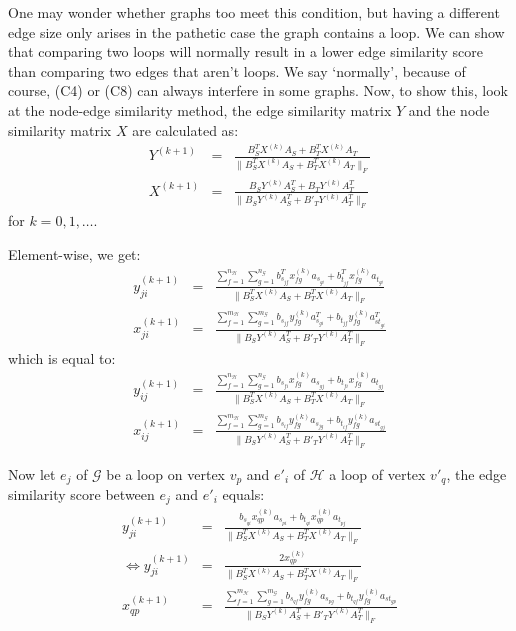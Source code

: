 \documentclass[a4paper,11pt]{report}
\newcommand{\graf}{\mathscr{G}}
\newcommand{\grafeen}{\mathscr{H}}
\begin{document}
\begin{itemize}
One may wonder whether graphs too meet this condition, but having a different edge size only 
arises in the pathetic case the graph contains a loop. We can show that comparing two loops will normally result
in a lower edge similarity score than comparing two edges that aren't loops. We say `normally', because of course, (C4) or (C8) can always
interfere in some graphs. Now, to show this, look at the 
node-edge similarity method, the edge similarity matrix $Y$ and the node 
similarity matrix $X$ are calculated as:
\begin{eqnarray}
  Y^{(k+1)} &=& \frac{B_S^TX^{(k)}A_S + B_T^TX^{(k)}A_T}{\|B_S^TX^{(k)}A_S + 
  B_T^TX^{(k)}A_T\|_F}\\
   X^{(k+1)} &=& \frac{B_SY^{(k)}A_S^T + B_TY^{(k)}A^T_T}{\|B_SY^{(k)}A_S^T + 
   B'_TY^{(k)}A^T_T\|_F} \end{eqnarray}
  for  $k =  0,1,\ldots$.
  
 Element-wise, we get:
  \begin{eqnarray*}
  y^{(k+1)}_{ji} &=& \frac{\sum^{n_\grafeen}_{f=1}\sum^{n_\graf}_{g=1} b_{s_{jf}}^Tx_{fg}^{(k)}a_{s_{gi}} + b_{t_{jf}}^Tx_{fg}^{(k)}a_{t_{gi}}}{\|B_S^TX^{(k)}A_S + 
  B_T^TX^{(k)}A_T\|_F}\\
   x^{(k+1)}_{ji} &=& \frac{\sum^{m_\grafeen}_{f=1}\sum^{m_\graf}_{g=1} b_{s_{jf}}y_{fg}^{(k)}a_{s_{gi}}^T + b_{t_{jf}}y_{fg}^{(k)}a_{st_{gi}}^T}{\|B_SY^{(k)}A_S^T + 
   B'_TY^{(k)}A^T_T\|_F}
 \end{eqnarray*}
 which is equal to:
  \begin{eqnarray*}
  y^{(k+1)}_{ij} &=& \frac{\sum^{n_\grafeen}_{f=1}\sum^{n_\graf}_{g=1} b_{s_{fi}}x_{fg}^{(k)}a_{s_{gj}} + b_{t_{fi}}x_{fg}^{(k)}a_{t_{gj}}}{\|B_S^TX^{(k)}A_S + 
  B_T^TX^{(k)}A_T\|_F}\\
   x^{(k+1)}_{ij} &=& \frac{\sum^{m_\grafeen}_{f=1}\sum^{m_\graf}_{g=1} b_{s_{if}}y_{fg}^{(k)}a_{s_{jg}} + b_{t_{if}}y_{fg}^{(k)}a_{st_{gj}}}{\|B_SY^{(k)}A_S^T + 
   B'_TY^{(k)}A^T_T\|_F}
 \end{eqnarray*}
  
 Now let $e_j$ of $\graf$ be a loop on vertex $v_p$ and $e'_i$ of $\grafeen$ a loop of vertex $v'_q$, 
 the edge similarity score between $e_j$ and $e'_i$ equals:
   \begin{eqnarray}
 y^{(k+1)}_{ji} &=& \frac{b_{s_{qi}}x_{qp}^{(k)}a_{s_{pi}} + b_{t_{qi}}x_{qp}^{(k)}a_{t_{pj}}}{\|B_S^TX^{(k)}A_S + 
  B_T^TX^{(k)}A_T\|_F}\\
 \Leftrightarrow  y^{(k+1)}_{ji} &=& \frac{2x_{qp}^{(k)}}{\|B_S^TX^{(k)}A_S + 
  B_T^TX^{(k)}A_T\|_F}\label{ditmoetgroeer}\\
   x^{(k+1)}_{qp} &=& \frac{\sum^{m_\grafeen}_{f=1}\sum^{m_\graf}_{g=1} 
   b_{s_{qf}}y_{fg}^{(k)}a_{s_{pg}} + b_{t_{qf}}y_{fg}^{(k)}a_{st_{gp}}}{\|B_SY^{(k)}A_S^T + 
   B'_TY^{(k)}A^T_T\|_F}
 \end{eqnarray}


\end{itemize}
\end{document}
